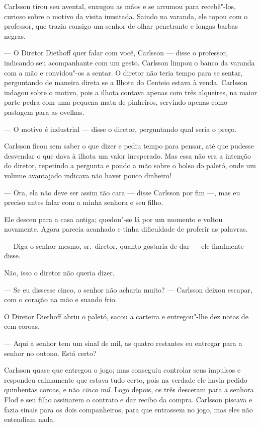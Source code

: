 Carlsson tirou seu avental, enxugou as mãos e se arrumou para recebê"-los,
curioso sobre o motivo da visita inusitada. Saindo na varanda, ele topou com o
professor, que trazia consigo um senhor de olhar penetrante e longas barbas negras.

--- O Diretor Diethoff quer falar com você, Carlsson --- disse o professor,
indicando seu acompanhante com um gesto. Carlsson limpou o banco da varanda com
a mão e convidou"-os a sentar. O diretor não teria tempo para se sentar,
perguntando de maneira direta se a Ilhota do Centeio estava à venda. Carlsson
indagou sobre o motivo, pois a ilhota contava apenas com três alqueires, na
maior parte pedra com uma pequena mata de pinheiros, servindo apenas como
pastagem para as ovelhas.

--- O motivo é industrial --- disse o diretor, perguntando qual seria o preço.

Carlsson ficou sem saber o que dizer e pediu tempo para pensar, até que pudesse
desvendar o que dava à ilhota um valor inesperado. Mas essa não era a intenção
do diretor, repetindo a pergunta e pondo a mão sobre o bolso do paletó, onde 
um volume avantajado indicava não haver pouco dinheiro!

--- Ora, ela não deve ser assim tão cara --- disse Carlsson por fim ---, mas eu
preciso antes falar com a minha senhora e seu filho.

Ele desceu para a casa antiga; quedou"-se lá por um momento e voltou novamente.
Agora parecia acanhado e tinha dificuldade de proferir as palavras.

--- Diga o senhor mesmo, sr.~diretor, quanto gostaria de dar --- ele
finalmente disse.

Não, isso o diretor não queria dizer.

--- Se eu dissesse cinco, o senhor não acharia muito? --- Carlsson deixou 
escapar, com o coração na mão e suando frio.

O Diretor Diethoff abriu o paletó, sacou a carteira e entregou"-lhe dez notas de
cem coroas.

--- Aqui a senhor tem um sinal de mil, as quatro restantes eu entregar para a
senhor no outono. Está certo?

Carlsson quase que entregou o jogo; mas conseguiu controlar seus impulsos e
respondeu calmamente que estava tudo certo, pois na verdade ele havia pedido
quinhentas coroas, e não \textit{cinco mil}. Logo depois, os três desceram para
a senhora Flod e seu filho assinarem o contrato e dar recibo da compra.
Carlsson piscava e fazia sinais para os dois companheiros, para que entrassem no
jogo, mas eles não entendiam nada.

